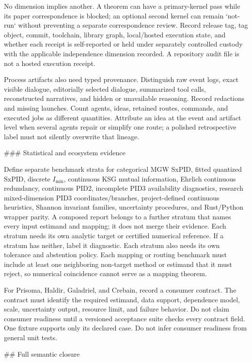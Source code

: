\documentclass[11pt]{article}
\begin{document}
\begin{markdown}
No dimension implies another. A theorem can have a primary-kernel pass while its paper
correspondence is blocked; an optional second kernel can remain `not-run` without preventing a
separate correspondence review. Record release tag, tag object, commit, toolchain, library graph,
local/hosted execution state, and whether each receipt is self-reported or held under separately
controlled custody with the applicable independence dimension recorded. A
repository audit file is not a hosted execution receipt.

Process artifacts also need typed provenance. Distinguish raw event logs, exact visible dialogue,
editorially selected dialogue, summarized tool calls, reconstructed narratives, and hidden or
unavailable reasoning. Record redactions and missing launches. Count agents, ideas, retained
routes, commands, and executed jobs as different quantities. Attribute an idea at the event and
artifact level when several agents repair or simplify one route; a polished retrospective label
must not silently overwrite that lineage.

### Statistical and ecosystem evidence

Define separate benchmark strata for categorical MGW SxPID, fitted quantized SxPID, discrete
$I_{\min}$, continuous KSG mutual information, Ehrlich continuous redundancy, continuous PID2,
incomplete PID3 availability diagnostics, research mixed-dimension PID3 coordinates/branches,
project-defined continuous heuristics, Shannon invariant families, uncertainty procedures, and
Rust/Python wrapper parity. A composed report belongs to a further stratum that names every input
estimand and mapping; it does not merge their evidence. Each stratum needs its own analytic target
or certified numerical reference. If a stratum has neither, label it diagnostic. Each stratum also
needs its own tolerance and abstention policy. Each mapping or routing benchmark must include at
least one neighboring non-target method or estimand that it must reject, so numerical coincidence
cannot serve as a mapping theorem.

For Prisoma, Haldir, Galadriel, and Crebain, record a consumer contract. The contract must identify
the required estimand, data support, dependence model, scale, uncertainty output, resource limit,
and failure behavior. Do not claim consumer readiness until a versioned acceptance suite checks
every contract field. One fixture supports only its declared case. Do not infer consumer readiness
from general unit tests.

## Full semantic closure


\end{markdown}
\end{document}
